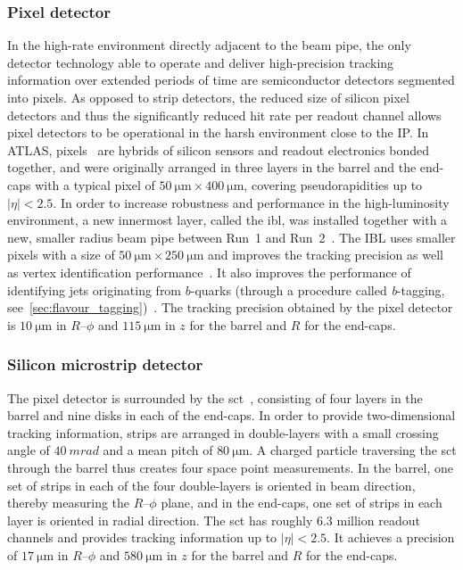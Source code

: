 \subsubsection{Pixel detector}

In the high-rate environment directly adjacent to the beam pipe, the only detector technology able to operate and deliver high-precision tracking information over extended periods of time are semiconductor detectors segmented into pixels. As opposed to strip detectors, the reduced size of silicon pixel detectors and thus the significantly reduced hit rate per readout channel allows pixel detectors to be operational in the harsh environment close to the IP.
In ATLAS, pixels~\cite{Aad:2008zzm} are hybrids of silicon sensors and readout electronics bonded together, and were originally arranged in three layers in the barrel and the end-caps with a typical pixel of $\SI{50}{\micro\meter}\times \SI{400}{\micro\meter}$, covering pseudorapidities up to $\vert\eta\vert < 2.5$.
In order to increase robustness and performance in the high-luminosity environment, a new innermost layer, called the \gls{ibl}, was installed together with a new, smaller radius beam pipe between Run~1 and Run~2~\cite{Abbott:2018ikt,Capeans:1291633}.
The IBL uses smaller pixels with a size of $\SI{50}{\micro\meter}\times \SI{250}{\micro\meter}$ and improves the tracking precision as well as vertex identification performance~\cite{Capeans:1291633}. It also improves the performance of identifying jets originating from $b$-quarks (through a procedure called \textit{b}-tagging, see~\cref{sec:flavour_tagging})~\cite{Aad:2019aic}. The tracking precision obtained by the pixel detector is $\SI{10}{\micro\meter}$ in $R$--$\phi$ and $\SI{115}{\micro\meter}$ in $z$ for the barrel and $R$ for the end-caps.

\subsubsection{Silicon microstrip detector}

The pixel detector is surrounded by the \gls{sct}~\cite{Aad:2008zzm}, consisting of four layers in the barrel and nine disks in each of the end-caps. In order to provide two-dimensional tracking information, strips are arranged in double-layers with a small crossing angle of $\SI{40}{mrad}$ and a mean pitch of $\SI{80}{\micro\meter}$.
A charged particle traversing the \gls{sct} through the barrel thus creates four space point measurements.
In the barrel, one set of strips in each of the four double-layers is oriented in beam direction, thereby measuring the $R$--$\phi$ plane, and in the end-caps, one set of strips in each layer is oriented in radial direction.
The \gls{sct} has roughly $6.3$ million readout channels and provides tracking information up to $\vert\eta\vert <2.5$.
It achieves a precision of $\SI{17}{\micro\meter}$ in $R$--$\phi$ and $\SI{580}{\micro\meter}$ in $z$ for the barrel and $R$ for the end-caps.

